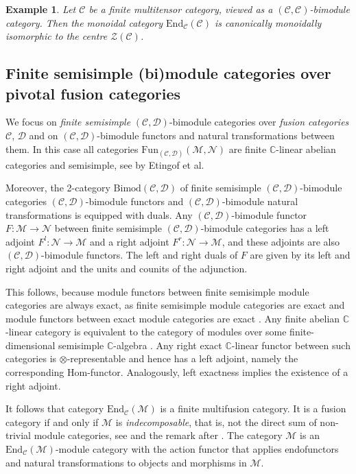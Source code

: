 \documentclass[1.5pt, a4paper]{article}
\newcommand{\C}{\mathbb{C}}
\newcommand{\mac}{\mathcal C}
\newcommand{\mad}{\mathcal D}
\newcommand{\mam}{\mathcal M}
\newcommand{\man}{\mathcal N}
\newcommand{\End}{\mathrm{End}}
\newcommand{\Fun}{\mathrm{Fun}}
\newcommand{\Bimod}{\mathrm{Bimod}}
\newtheorem{example}[theorem]{Example}
\begin{document}
\begin{example}\label{ex:center} \cite[Prop.~7.13.8.]{EGNO} Let $\mac$ be a finite multitensor category, viewed as a $(\mac,\mac)$-bimodule category. 
Then  the monoidal category $\End_\mac(\mac)$ is canonically monoidally isomorphic to the centre $\mathcal Z(\mac)$.
\end{example}

\subsection{Finite semisimple (bi)module categories over pivotal fusion categories}
\label{subsec:semisimple}
We focus on {\em finite semisimple} $(\mac,\mad)$-bimodule categories  over {\em fusion categories} $\mac$, $\mad$ and on $(\mac,\mad)$-bimodule functors and  natural transformations between them. In this case
all categories $\Fun_{(\mac,\mad)}(\mam,\man)$ are finite $\C$-linear abelian categories  \cite[Prop.~7.11.6]{EGNO} and  semisimple, see \cite[Th.~2.16]{ENO} by Etingof et al. 

Moreover, the  2-category  $\Bimod(\mac,\mad)$  of finite semisimple $(\mac,\mad)$-bimodule categories $(\mac,\mad)$-bimodule functors and $(\mac,\mad)$-bimodule natural transformations  is equipped with duals. Any $(\mac,\mad)$-bimodule functor $F:\mam\to\man$ between finite semisimple $(\mac,\mad)$-bimodule categories
has a left adjoint $F^l:\man\to\mam$ and a right adjoint $F^r:\man\to\mam$, and  these adjoints are also $(\mac,\mad)$-bimodule functors.  The left and right  duals of $F$  are  given by its left and right adjoint and  the units and counits of the adjunction.

This follows, because module functors between finite semisimple module categories are always exact, as finite semisimple module categories are exact and module functors between exact module categories are exact \cite[Prop.~7.6.9]{EGNO}. Any finite abelian $\C$-linear  category is equivalent to the category  of modules over some finite-dimensional semisimple $\C$-algebra \cite[Def.~1.8.5]{EGNO}. Any right exact $\C$-linear functor between such categories  is $\otimes$-representable \cite[Prop.~1.8.10]{EGNO}  and hence has a left adjoint, namely the corresponding Hom-functor. Analogously,  left exactness implies the existence of a right adjoint. 

 
 It follows that category $\End_\mac(\mam)$ is a finite multifusion category. It is a fusion category if and only if $\mam$ is {\em indecomposable}, that is, not the direct sum of non-trivial module categories,  see \cite[Sec.~7.3.6]{EGNO} and  the remark after \cite[Def.~7.2.12]{EGNO}. 
 The category $\mam$ is an $\End_\mac(\mam)$-module category with the action functor that applies endofunctors and natural transformations to objects and morphisms in $\mam$.
 
\end{document}
